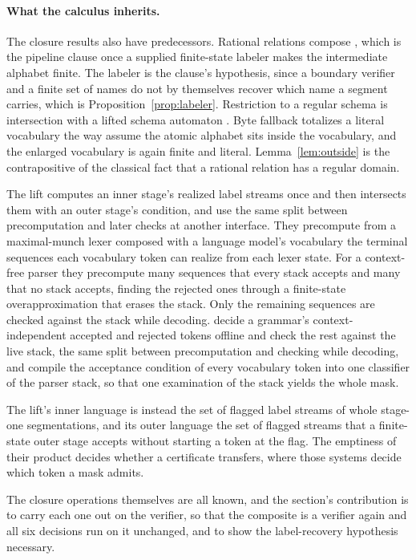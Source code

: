 \documentclass[11pt,a4paper]{article}
\theoremstyle{definition}
\theoremstyle{plain}
\begin{document}
\paragraph{What the calculus inherits.} The closure results also have predecessors. Rational relations compose
\citep[Theorem~4.13]{elgot1965relations}, which is the pipeline clause once a supplied finite-state labeler makes the
intermediate alphabet finite. The labeler is the clause's hypothesis, since a boundary verifier and a finite set of
names do not by themselves recover which name a segment carries, which is Proposition~\ref{prop:labeler}. Restriction to
a regular schema is intersection with a lifted schema automaton \citep[Theorem~6]{rabin1959finite}. Byte fallback
totalizes a literal vocabulary the way \citet{cognetta2025tokenization} assume the atomic alphabet sits inside the
vocabulary, and the enlarged vocabulary is again finite and literal. Lemma~\ref{lem:outside} is the contrapositive of
the classical fact that a rational relation has a regular domain.

The lift computes an inner stage's realized label streams once and then intersects them with an outer stage's condition,
and \citet{park2025flexible} use the same split between precomputation and later checks at another interface. They
precompute from a maximal-munch lexer composed with a language model's vocabulary the terminal sequences each vocabulary
token can realize from each lexer state. For a context-free parser they precompute many sequences that every stack
accepts and many that no stack accepts, finding the rejected ones through a finite-state overapproximation that erases
the stack. Only the remaining sequences are checked against the stack while decoding. \citet{dong2025xgrammar} decide a
grammar's context-independent accepted and rejected tokens offline and check the rest against the live stack, the same
split between precomputation and checking while decoding, and \citet{li2026psc} compile the acceptance condition of
every vocabulary token into one classifier of the parser stack, so that one examination of the stack yields the whole
mask.

The lift's inner language is instead the set of flagged label streams of whole stage-one segmentations, and its outer
language the set of flagged streams that a finite-state outer stage accepts without starting a token at the flag. The
emptiness of their product decides whether a certificate transfers, where those systems decide which token a mask
admits.

The closure operations themselves are all known, and the section's contribution is to carry each one out on the
verifier, so that the composite is a verifier again and all six decisions run on it unchanged, and to show the
label-recovery hypothesis necessary.
\end{document}
